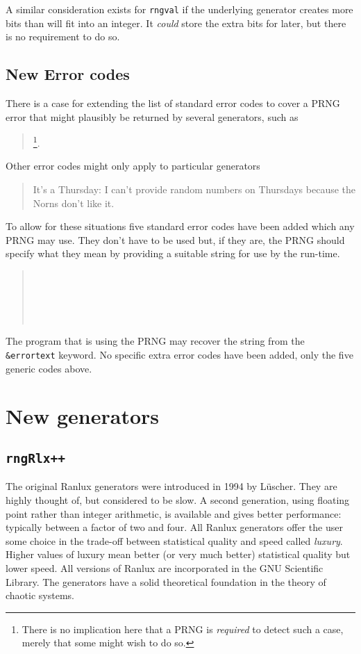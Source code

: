 \documentclass[letterpaper,12pt]{article}
\begin{document}
A similar consideration exists for \texttt{rngval} if the underlying generator creates
more bits than will fit into an integer.  It {\em could} store the extra bits for later, but
there is no requirement to do so.

\subsection{New Error codes}
There is a case for extending the list of standard error codes to cover a
PRNG error that might plausibly be returned by several generators, such as
\begin{quote}
  \footnote{
    There is no implication here that a PRNG is {\em required} to detect
    such a case, merely that some might wish to do so.
    }.
\end{quote}
Other error codes might only apply to particular generators
\begin{quote}
  {It's a Thursday: I can't provide random numbers on Thursdays because
  the Norns don't like it.}
\end{quote}
To allow for these situations five standard error codes have been
added which any PRNG may use. They don't have to be used but, if they are, the PRNG should
specify what they mean by providing a suitable string for use by the run-time.
\begin{quote}
  \\
  \\
  \\
  \\
\end{quote}
The program that is using the PRNG may recover the string from the \texttt{\&errortext}
keyword.  No specific extra error codes have been added, only the five generic codes
above.

\section{New generators}
\subsection{\texttt{rngRlx++}}
The original Ranlux generators were introduced in 1994 by L\"uscher\cite{Luscher:1994}.
They are highly thought of, but considered to be slow. A second generation, using floating
point rather than integer arithmetic, is available and gives better performance: typically
between a factor of two and four\cite{Luscher:Ranlux2}. All Ranlux generators offer the
user some choice in the trade-off between statistical quality and speed called {\em
luxury}. Higher values of luxury mean better (or very much better) statistical quality
but lower speed. All versions of Ranlux are incorporated in the GNU Scientific
Library\cite{GnuScientificLibrary}.  The generators have a solid theoretical foundation in
the theory of chaotic systems.
\end{document}
